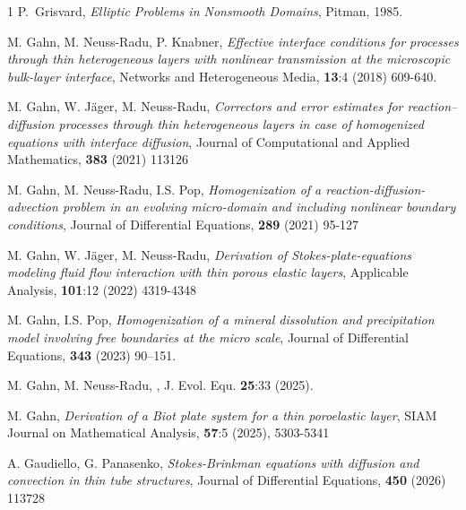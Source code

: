 \documentclass[reqno]{amsart}            %
\numberwithin{equation}{section}
\begin{document}
\begin{thebibliography}{1}
		P.~Grisvard,
		\textit{Elliptic Problems in Nonsmooth Domains},
		Pitman, 1985.
		
		M. Gahn, M. Neuss-Radu, P. Knabner, \textit{Effective interface conditions for processes through thin heterogeneous layers with nonlinear transmission at the microscopic bulk-layer interface}, Networks and Heterogeneous Media, \textbf{13}:4  (2018) 609-640. 
		
		M. Gahn, W. Jäger,  M. Neuss-Radu, \textit{
			Correctors and error estimates for reaction–diffusion processes through thin heterogeneous layers in case of homogenized equations with interface diffusion},
		Journal of Computational and Applied Mathematics, \textbf{383} (2021)
		113126
		
		M. Gahn, M. Neuss-Radu, I.S. Pop, \textit{Homogenization of a reaction-diffusion-advection problem in an evolving micro-domain and including nonlinear boundary conditions},
		Journal of Differential Equations,
		\textbf{289} (2021) 95-127
		
		
		M. Gahn, W. Jäger,  M. Neuss-Radu, \textit{Derivation of Stokes-plate-equations modeling fluid flow interaction with thin porous elastic layers}, Applicable Analysis, \textbf{101}:12 (2022) 4319-4348 
		
		M. Gahn, I.S. Pop, \textit{Homogenization of a mineral dissolution and precipitation model involving
			free boundaries at the micro scale}, Journal of Differential Equations, \textbf{343}  (2023) 90–151.
		
		
		M. Gahn, M. Neuss-Radu, ,  J. Evol. Equ. \textbf{25}:33 (2025). %
		
		M. Gahn, \textit{Derivation of a Biot plate system for a thin poroelastic layer}, SIAM Journal on Mathematical Analysis, \textbf{57}:5 (2025), 5303-5341
		
		A. Gaudiello, G. Panasenko, \textit{Stokes-Brinkman equations with diffusion and convection in thin tube structures},
		Journal of Differential Equations, \textbf{450} (2026) 113728
		

\end{thebibliography}
\end{document}
